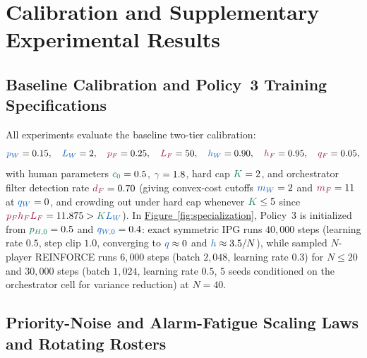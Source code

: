 \documentclass[11pt,reqno]{amsart}
\theoremstyle{spacious}
\newcommand{\Ftxt}[1]{\textcolor{colF}{#1}}
\newcommand{\Htxt}[1]{\textcolor{colH}{#1}}
\newcommand{\Wv}[1]{{\color{colW}#1}}
\newcommand{\Fv}[1]{{\color{colF}#1}}
\newcommand{\Hv}[1]{{\color{colH}#1}}
\begin{document}
\section{Calibration and Supplementary Experimental Results}
\label{app:details}

\subsection{Baseline Calibration and Policy~3 Training Specifications}
\label{subsec:calibration}

All experiments evaluate the baseline two-tier calibration:
\[
  \Wv{p_W} = 0.15,\quad \Wv{L_W} = 2,\quad \Fv{p_F} = 0.25,\quad \Fv{L_F} = 50,\quad \Wv{h_W} = 0.90,\quad \Fv{h_F} = 0.95,\quad \Fv{q_F} = 0.05,
\]
with \Htxt{human} parameters $\Hv{c_0} = 0.5$, $\Hv{\gamma} = 1.8$, hard cap $\Hv{K} = 2$, and \Ftxt{orchestrator} filter detection rate $\Fv{d_F} = 0.70$ (giving convex-cost cutoffs $\Wv{m_W} = 2$ and $\Fv{m_F} = 11$ at $\Wv{q_W} = 0$, and crowding out under hard cap whenever $\Hv{K} \le 5$ since $\Fv{p_F h_F L_F} = 11.875 > \Hv{K}\Wv{L_W}$). In \hyperref[fig:specialization]{Figure~\ref{fig:specialization}}, Policy~3 is initialized from $\Hv{p_{H,0}} = 0.5$ and $\Wv{q_{W,0}} = 0.4$: exact symmetric IPG runs $40{,}000$ steps (learning rate $0.5$, step clip $1.0$, converging to $\Wv{q} \approx 0$ and $\Wv{h} \approx 3.5/N$), while sampled $N$-player REINFORCE runs $6{,}000$ steps (batch $2{,}048$, learning rate $0.3$) for $N \le 20$ and $30{,}000$ steps (batch $1{,}024$, learning rate $0.5$, $5$ seeds conditioned on the \Ftxt{orchestrator} cell for variance reduction) at $N = 40$.

\subsection{Priority-Noise and Alarm-Fatigue Scaling Laws and Rotating Rosters}
\label{subsec:scaling_roster}
\end{document}
